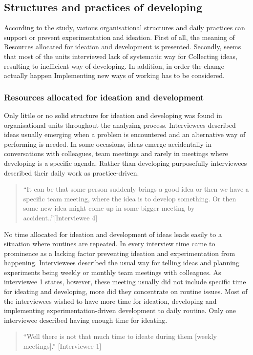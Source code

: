 \subsection{Structures and practices of developing}
According to the study, various organisational structures and daily practices can support or prevent experimentation and ideation. First of all, the meaning of Resources allocated for ideation and development is presented. Secondly, seems that most of the units interviewed lack of systematic way for Collecting ideas, resulting to inefficient way of developing. In addition, in order the change actually happen Implementing new ways of working has to be considered. 

\subsubsection{Resources allocated for ideation and development}
Only little or no solid structure for ideation and developing was found in organisational units throughout the analyzing process. Interviewees described ideas usually emerging when a problem is encountered and an alternative way of performing is needed. In some occasions, ideas emerge accidentally  in conversations with colleagues, team meetings and rarely in meetings where developing is a specific agenda. Rather than developing purposefully interviewees described their daily work as practice-driven. 
\begin{quote}
``It can be that some person suddenly brings a good idea or then we have a specific team meeting, where the idea is to develop something. Or then some new idea might come up in some bigger meeting by accident..''[Interviewee 4]
\end{quote}
No time allocated for ideation and development of ideas leads easily to a situation where routines are repeated. In every interview time came to prominence as a lacking factor preventing ideation and experimentation from happening. Interviewees described the usual way for telling ideas and planning experiments being weekly or monthly team meetings with colleagues. As interviewee 1 states, however, these meeting usually did not include specific time for ideating and developing, more did they concentrate on routine issues. Most of the interviewees wished to have more time for ideation, developing and implementing experimentation-driven development to daily routine. Only one interviewee described having enough time for ideating. 
\begin{quote}
``Well there is not that much time to ideate during them [weekly meetings].'' [Interviewee 1]
\end{quote}
